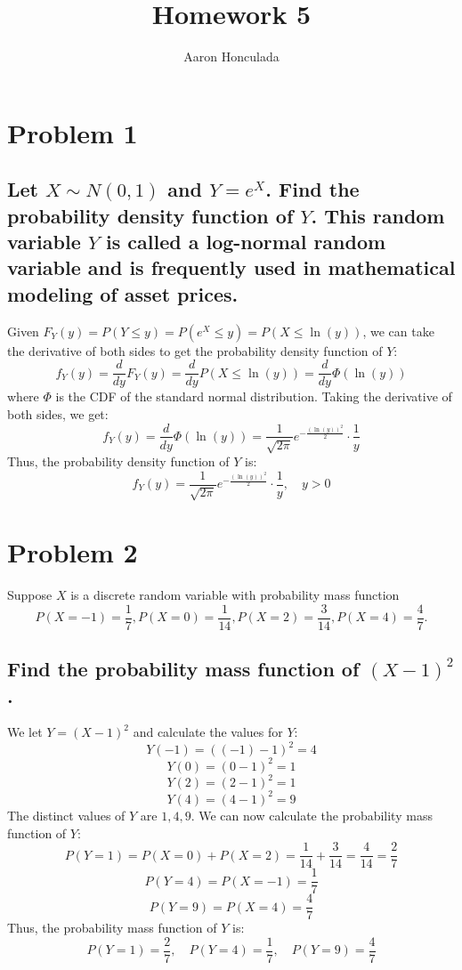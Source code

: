 \documentclass{article}
\title{Homework 5}
\author{Aaron Honculada}
\date{\monthname[\month] \the\year}
\theoremstyle{plain} %
\theoremstyle{definition} %
\begin{document}
\maketitle

\section*{Problem 1}
\subsection*{Let $X \sim N(0,1)$ and $Y=e^X$.
Find the probability density function of $Y$. This random
variable $Y$ is called a log-normal random variable and is
frequently used in mathematical modeling of asset prices.}
Given $F_Y(y) = P(Y \leq y) = P(e^X \leq y) = P(X \leq \ln(y))$, we can take the derivative of both sides to get the probability density function of $Y$:
\[
    f_Y(y) = \frac{d}{dy} F_Y(y) = \frac{d}{dy} P(X \leq \ln(y)) = \frac{d}{dy} \Phi(\ln(y))
\]
where $\Phi$ is the CDF of the standard normal distribution.
Taking the derivative of both sides, we get:
\[
    f_Y(y) = \frac{d}{dy} \Phi(\ln(y)) = \frac{1}{\sqrt{2\pi}} e^{-\frac{(\ln(y))^2}{2}} \cdot \frac{1}{y}
\]
Thus, the probability density function of $Y$ is:
\[
    f_Y(y) = \boxed{\frac{1}{\sqrt{2\pi}} e^{-\frac{(\ln(y))^2}{2}} \cdot \frac{1}{y}, \quad y > 0}
\]


\section*{Problem 2}
Suppose $X$ is a discrete random variable with probability mass function
\[
    P(X=-1)=\frac{1}{7},
    P(X=0)=\frac{1}{14},
    P(X=2)=\frac{3}{14},
    P(X=4)=\frac{4}{7}.
\]
\subsection*{Find the probability mass function of $(X-1)^2$.}
We let $Y = (X-1)^2$ and calculate the values for $Y$:
\[
    Y(-1) = ((-1)-1)^2 = 4
\]
\[
    Y(0) = (0-1)^2 = 1
\]
\[
    Y(2) = (2-1)^2 = 1
\]
\[
    Y(4) = (4-1)^2 = 9
\]
The distinct values of $Y$ are $1, 4, 9$. We can now calculate the probability mass function of $Y$:
\[
    P(Y=1) = P(X=0) + P(X=2) = \frac{1}{14} + \frac{3}{14} = \frac{4}{14} = \frac{2}{7}
\]
\[
    P(Y=4) = P(X=-1) = \frac{1}{7}
\]
\[
    P(Y=9) = P(X=4) = \frac{4}{7}
\]
Thus, the probability mass function of $Y$ is:
\[
    \boxed{P(Y=1) = \frac{2}{7}, \quad P(Y=4) = \frac{1}{7}, \quad P(Y=9) = \frac{4}{7}}
\]
\end{document}
